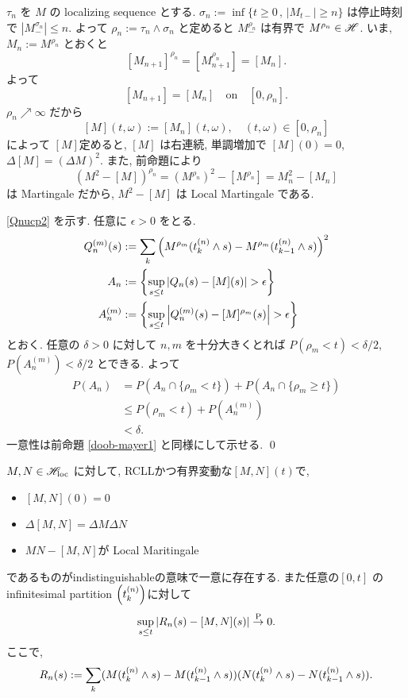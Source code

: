 \documentclass{ltjsarticle}
\begin{document}
\begin{prf}
	\( \tau_n \) を \( M \) の localizing sequence とする. 
	\( \sigma_n := \inf \{ t \ge 0 \,, \, | M_{t-} | \ge n \} \) は停止時刻で
	\( | M_{-} ^ { \sigma_n } | \le n \).
	よって \( \rho_n := \tau_n \wedge \sigma_n \) と定めると
	\( M_{-} ^ { \rho_n } \) は有界で \( M ^ { \rho_n } \in \mathscr{H} \).
	いま, \( M_n := M ^ { \rho_n } \) とおくと
	\[
		[M_{ n + 1 }] ^ { \rho_n } = [M_{ n + 1 } ^ { \rho_n } ] = [M_n].
	\]
	よって
	\[
		[M_{ n + 1 }] = [M_n] \quad \text{on} \quad [0, \rho_n].
	\]
	\( \rho_n \nearrow \infty \) だから
	\[
		[M] (t, \omega) := [M_n] (t, \omega), \quad (t, \omega) \in [0, \rho_n]
	\]
	によって \( [M] \)定めると,
	\( [M] \) は右連続, 単調増加で \( [M](0) = 0 \), \( \Delta [M] = ( \Delta M )^2 \).
	また, 前命題により
	\[
		( M^2 - [M] )^{ \rho_n } = ( M^{ \rho_n } )^2 - [ M^{ \rho_n } ] = M_n^2 - [M_n] 
	\]
	は Martingale だから, \( M^2 - [M] \) は Local Martingale である.
	
	\eqref{Qnucp2} を示す. 任意に \( \epsilon > 0 \) をとる.
	\begin{align*}
		Q^{(m)}_n(s) & := 
		\sum_k \left(M^{ \rho_m } ( t_k^{(n)} \wedge s )
		- M^{ \rho_m } ( t_{k-1}^{(n)} \wedge s ) \right)^2
		\\
		A_n          & := 	\left\{ 
		\sup_{ s \le t }
		\left| Q_n(s)-[M](s) \right| > \epsilon 
		\right\}
		\\
		A^{(m)}_n    & := 	
		\left\{ 
		\sup_{ s \le t }
		\left|
		Q^{(m)}_n(s)-[M]^{ \rho_m } (s) 
		\right| 
		> \epsilon 
		\right\}
	\end{align*}
	とおく.
	任意の \( \delta > 0 \) に対して \( n,m \) を十分大きくとれば
	\( P( \rho_m < t ) < \delta / 2 \), \( P( A^{(m)}_n ) < \delta / 2 \) とできる. よって
	\begin{align*}
		P(A_n) & =	P(A_n \cap \{ \rho_m < t \} )
		+ P(A_n \cap \{ \rho_m \ge t \} )
		\\
		       & \le	P( \rho_m < t ) + P(A^{(m)}_n)
		\\
		       & < \delta.
	\end{align*}
	一意性は前命題 \ref{doob-mayer1} と同様にして示せる.
	\qed\end{prf}	%

\begin{cor} \label{existence QCV process}
	\( M , N \in \mathscr{H}_{\mathrm{loc}} \) に対して, RCLLかつ有界変動な\( [M, N](t) \)で, 
	\begin{itemize}
		\item	\( [M, N](0) = 0 \)
		\item	\( \Delta [M, N] = \Delta M \Delta N \)
		\item	\( MN - [M, N] \)が Local Maritingale
	\end{itemize}
	であるものがindistinguishableの意味で一意に存在する.
	また任意の\( [0,t] \) のinfinitesimal partition \( \left( t_k^{(n)} \right) \)に対して
	\begin{equation}		\label{Rnucp}
		\sup_{ s \le t } \left| R_n(s)-[M, N](s) \right| \stackrel{ \mathrm{P} }{ \to } 0.
	\end{equation}
	ここで,
	\[
		R_n(s) := \sum_k (M ( t_k^{(n)} \wedge s ) - M ( t_{k-1}^{(n)} \wedge s ) )
		(N ( t_k^{(n)} \wedge s ) - N ( t_{k-1}^{(n)} \wedge s ) ).
	\]
\end{cor}
\end{document}
